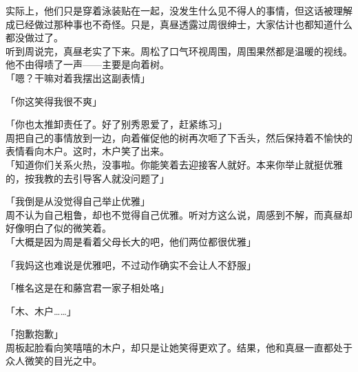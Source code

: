 实际上，他们只是穿着泳装贴在一起，没发生什么见不得人的事情，但这话被理解成已经做过那种事也不奇怪。只是，真昼透露过周很绅士，大家估计也都知道什么都没做过了。\\

听到周说完，真昼老实了下来。周松了口气环视周围，周围果然都是温暖的视线。他不由得啧了一声——主要是向着树。\\

「嗯？干嘛对着我摆出这副表情」

「你这笑得我很不爽」

「你也太推卸责任了。好了别秀恩爱了，赶紧练习」\\

周把自己的事情放到一边，向着催促他的树再次咂了下舌头，然后保持着不愉快的表情看向木户。这时，木户笑了出来。\\

「知道你们关系火热，没事啦。你能笑着去迎接客人就好。本来你举止就挺优雅的，按我教的去引导客人就没问题了」

「我倒是从没觉得自己举止优雅」\\

周不认为自己粗鲁，却也不觉得自己优雅。听对方这么说，周感到不解，而真昼却好像明白了似的微笑着。\\

「大概是因为周是看着父母长大的吧，他们两位都很优雅」

「我妈这也难说是优雅吧，不过动作确实不会让人不舒服」

「椎名这是在和藤宫君一家子相处咯」

「木、木户……」

「抱歉抱歉」\\

周板起脸看向笑嘻嘻的木户，却只是让她笑得更欢了。结果，他和真昼一直都处于众人微笑的目光之中。
